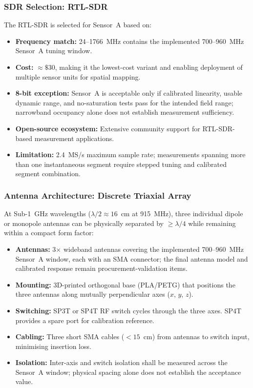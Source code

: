 \documentclass[11pt,a4paper]{article}
\begin{document}
\subsubsection{SDR Selection: RTL-SDR}

The RTL-SDR is selected for Sensor~A based on:

\begin{itemize}
    \item \textbf{Frequency match:} 24--1766~MHz contains the implemented 700--960~MHz Sensor~A tuning window.
    \item \textbf{Cost:} $\approx \$30$, making it the lowest-cost variant and enabling deployment of multiple sensor units for spatial mapping.
    \item \textbf{8-bit exception:} Sensor~A is acceptable only if calibrated linearity, usable dynamic range, and no-saturation tests pass for the intended field range; narrowband occupancy alone does not establish measurement sufficiency.
    \item \textbf{Open-source ecosystem:} Extensive community support for RTL-SDR-based measurement applications.
    \item \textbf{Limitation:} 2.4~MS/s maximum sample rate; measurements spanning more than one instantaneous segment require stepped tuning and calibrated segment combination.
\end{itemize}

\subsubsection{Antenna Architecture: Discrete Triaxial Array}

At Sub-1~GHz wavelengths ($\lambda/2 \approx 16$~cm at 915~MHz), three individual dipole or monopole antennas can be physically separated by $\geq \lambda/4$ while remaining within a compact form factor:

\begin{itemize}
    \item \textbf{Antennas:} 3$\times$ wideband antennas covering the implemented 700--960~MHz Sensor~A window, each with an SMA connector; the final antenna model and calibrated response remain procurement-validation items.
    \item \textbf{Mounting:} 3D-printed orthogonal base (PLA/PETG) that positions the three antennas along mutually perpendicular axes ($x$, $y$, $z$).
    \item \textbf{Switching:} SP3T or SP4T RF switch cycles through the three axes. SP4T provides a spare port for calibration reference.
    \item \textbf{Cabling:} Three short SMA cables ($< 15$~cm) from antennas to switch input, minimising insertion loss.
    \item \textbf{Isolation:} Inter-axis and switch isolation shall be measured across the Sensor~A window; physical spacing alone does not establish the acceptance value.
\end{itemize}
\end{document}
